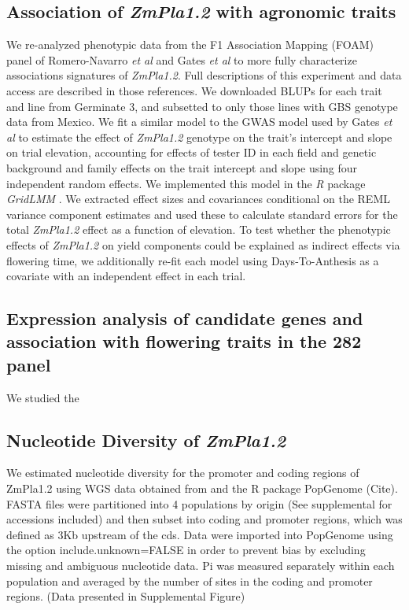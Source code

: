 \documentclass[9pt,twocolumn,twoside]{BioRxiv}
\begin{document}
\subsection{Association of \textit{ZmPla1.2} with agronomic traits}
We re-analyzed phenotypic data from the F1 Association Mapping (FOAM) panel of Romero-Navarro \textit{et al} \cite{Romero_Navarro2017-cn} and Gates \textit{et al} \cite{Gates2019-xu} to more fully characterize associations signatures of \textit{ZmPla1.2}. 
Full descriptions of this experiment and data access are described in those references. 
We downloaded BLUPs for each trait and line from Germinate 3, and subsetted to only those lines with GBS genotype data from Mexico. 
We fit a similar model to the GWAS model used by Gates \textit{et al} \cite{Gates2019-xu} to estimate the effect of \textit{ZmPla1.2} genotype on the trait's intercept and slope on trial elevation, accounting for effects of tester ID in each field and genetic background and family effects on the trait intercept and slope using four independent random effects. 
We implemented this model in the \textit{R} package \textit{GridLMM} \cite{GridLMM2019}. 
We extracted effect sizes and covariances conditional on the REML variance component estimates and used these to calculate standard errors for the total \textit{ZmPla1.2} effect as a function of elevation. 
To test whether the phenotypic effects of \textit{ZmPla1.2} on yield components could be explained as indirect effects via flowering time, we additionally re-fit each model using Days-To-Anthesis as a covariate with an independent effect in each trial.
\subsection{Expression analysis of candidate genes and association with flowering traits in the 282 panel}
We studied the 

\subsection{Nucleotide Diversity of \textit{ZmPla1.2} }
We estimated nucleotide diversity for the promoter and coding regions of ZmPla1.2 using WGS data obtained from \cite{Wang2017-bc} and the R package PopGenome (Cite). 
FASTA files were partitioned into 4 populations by origin (See supplemental for accessions included) and then subset into coding and promoter regions, which was defined as 3Kb upstream of the cds. 
Data were imported into PopGenome using the option include.unknown=FALSE in order to prevent bias by excluding missing and ambiguous nucleotide data.
Pi was measured separately within each population and averaged by the number of sites in the coding and promoter regions. (Data presented in Supplemental Figure)
\end{document}
